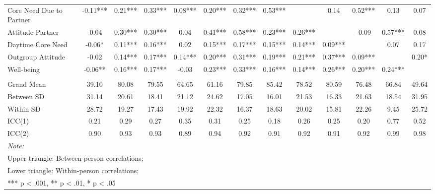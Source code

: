 \begin{sidewaystable*}[!hbtp]
{\begin{tabular}[t]{lcccccccccccc}
\hspace{1em}Core Need Due to Partner & -0.11*** & 0.21*** & 0.33*** & 0.08*** & 0.20*** & 0.32*** & 0.53*** &  & 0.14 & 0.52*** & 0.13 & 0.07\\
\hspace{1em}Attitude Partner & -0.04 & 0.30*** & 0.30*** & 0.04 & 0.41*** & 0.58*** & 0.23*** & 0.26*** &  & -0.09 & 0.57*** & 0.08\\
\hspace{1em}Daytime Core Need & -0.06* & 0.11*** & 0.16*** & 0.02 & 0.15*** & 0.17*** & 0.15*** & 0.14*** & 0.09*** &  & 0.07 & 0.17\\
\hspace{1em}Outgroup Attitude & -0.02 & 0.14*** & 0.17*** & 0.14*** & 0.20*** & 0.31*** & 0.19*** & 0.21*** & 0.37*** & 0.09*** &  & 0.20*\\
\hspace{1em}Well-being & -0.06** & 0.16*** & 0.17*** & -0.03 & 0.23*** & 0.33*** & 0.16*** & 0.14*** & 0.26*** & 0.20*** & 0.24*** & \\
\addlinespace[0.3em]
\multicolumn{13}{l}{\textbf{Descriptives}}\\
\hspace{1em}Grand Mean & 39.10 & 80.08 & 79.55 & 64.65 & 61.16 & 79.85 & 85.42 & 78.52 & 80.59 & 76.48 & 66.84 & 49.64\\
\hspace{1em}Between SD & 31.14 & 20.61 & 18.41 & 21.12 & 24.62 & 17.05 & 16.01 & 21.53 & 16.33 & 21.63 & 18.54 & 31.95\\
\hspace{1em}Within SD & 28.72 & 19.27 & 17.43 & 19.92 & 22.32 & 16.37 & 18.63 & 20.02 & 15.81 & 22.26 & 9.45 & 25.72\\
\hspace{1em}ICC(1) & 0.21 & 0.29 & 0.27 & 0.35 & 0.31 & 0.25 & 0.18 & 0.26 & 0.25 & 0.20 & 0.77 & 0.52\\
\hspace{1em}ICC(2) & 0.90 & 0.93 & 0.93 & 0.89 & 0.94 & 0.92 & 0.91 & 0.92 & 0.91 & 0.92 & 0.99 & 0.98\\
\bottomrule
\multicolumn{13}{l}{\rule{0pt}{1em}\textit{Note: }}\\
\multicolumn{13}{l}{\rule{0pt}{1em}Upper triangle: Between-person correlations;}\\
\multicolumn{13}{l}{\rule{0pt}{1em}Lower triangle: Within-person correlations;}\\
\multicolumn{13}{l}{\rule{0pt}{1em}*** p < .001, ** p < .01,  * p < .05}\\
\end{tabular}}
\end{sidewaystable*}
